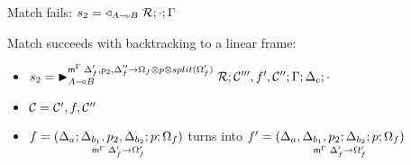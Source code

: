 
\item Match fails: $s_2 = \contstate{A \lolli B}{\rulestk}{\cdot}{\Gamma}$

\item Match succeeds with backtracking to a linear frame:
\begin{itemize}
   \item $s_2 = \matstate{A \lolli B}{\rulestk}{\lstack{C'''}, f',
      \lstack{C''}}{\Gamma}{\Delta_c}{\cdot}{\Delta'_f, p_2, \Delta''_f \rightarrow
      \Omega_f \otimes p \otimes split(\Omega'_f)}$

   \item $\lstack{C} = \lstack{C'}, f, \lstack{C''}$

   \item $f = \lframe{\Delta_a}{\Delta_{b_1}, p_2, \Delta_{b_2}}{p}{\Omega_f}{\Delta_f'}{\Omega_f'}$
   turns into $f' = \lframe{\Delta_a, \Delta_{b_1},
      p_2}{\Delta_{b_2}}{p}{\Omega_f}{\Delta'_f}{\Omega'_f}$

\end{itemize}
